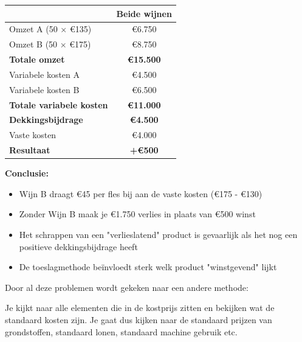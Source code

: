 \documentclass[a4paper,11pt]{article}
\begin{document}
\begin{description}
\begin{oefenblok}
              \begin{tabular}{lc}
                  \hline
                                                   & \textbf{Beide wijnen} \\
                  \hline
                  Omzet A (50 × €135)              & €6.750                \\
                  Omzet B (50 × €175)              & €8.750                \\
                  \textbf{Totale omzet}            & \textbf{€15.500}      \\
                  Variabele kosten A               & €4.500                \\
                  Variabele kosten B               & €6.500                \\
                  \textbf{Totale variabele kosten} & \textbf{€11.000}      \\
                  \textbf{Dekkingsbijdrage}        & \textbf{€4.500}       \\
                  Vaste kosten                     & €4.000                \\
                  \textbf{Resultaat}               & \textbf{+€500}        \\
                  \hline
              \end{tabular}

              \textbf{Conclusie:}
              \begin{itemize}
                  \item Wijn B draagt €45 per fles bij aan de vaste kosten (€175 - €130)
                  \item Zonder Wijn B maak je €1.750 verlies in plaats van €500 winst
                  \item Het schrappen van een "verlieslatend" product is gevaarlijk als het nog een positieve dekkingsbijdrage heeft
                  \item De toeslagmethode beïnvloedt sterk welk product "winstgevend" lijkt
              \end{itemize}
          \end{oefenblok}


          Door al deze problemen wordt gekeken naar een andere methode:
    \item{} Je kijkt naar
          alle elementen die in de kostprijs zitten
          en bekijken wat de standaard kosten zijn.
          Je gaat dus kijken naar de standaard prijzen van grondstoffen,
          standaard lonen, standaard machine gebruik etc.
          \newline


\end{description}
\end{document}
